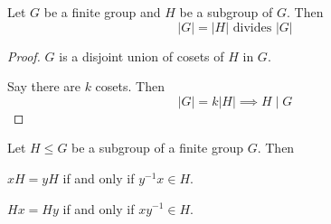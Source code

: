 \begin{theorem}\label{thm:langrange}
    Let $G$ be a finite group and $H$ be a subgroup of $G$. Then \[
        |G| = |H| \text{ divides } |G|
    \]
\end{theorem}

\begin{proof}
    $G$ is a disjoint union of cosets of $H$ in $G$.

    Say there are $k$ cosets. Then \[
        |G| = k |H| \implies H \mid G
    \]
\end{proof}

\begin{corollary}\label{cor:cyclic-subgroup}
    Let $H \leq G$ be a subgroup of a finite group $G$. Then 
    \begin{listo}
        \item $xH = yH$ if and only if $y^{-1}x \in H$.
        \item $Hx = Hy$ if and only if $xy^{-1} \in H$.
    \end{listo}
\end{corollary}

